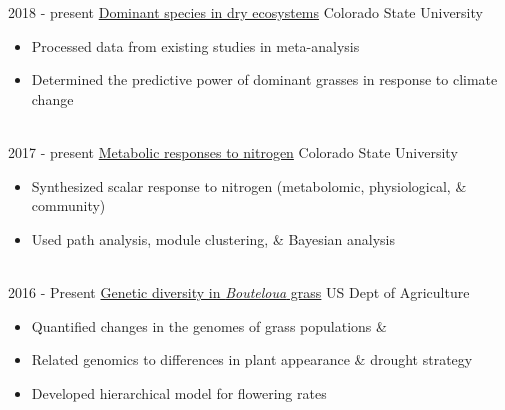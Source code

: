 \documentclass[letterpaper]{twentysecondcv} %
\begin{document}
\begin{twenty} %
    \twentyitem
   		{2018 -}
		{present}
        {\href{https://github.com/avahoffman/dryland-dominance}{Dominant species in dry ecosystems}}
       	{Colorado State University}
        {}
        {
        \vspace{-2mm}
        {\begin{itemize}
        \item Processed data from existing studies in meta-analysis
        \item Determined the predictive power of dominant grasses in response to climate change
    \end{itemize}}
        }
     \\
\twentyitem
   		{2017 -}
		{present}
        {\href{https://github.com/avahoffman/change-metabolomics}{Metabolic responses to nitrogen}}
       	{Colorado State University}
        {}
        {
        \vspace{-2mm}
        {\begin{itemize}
        \item Synthesized scalar response to nitrogen (metabolomic, physiological, \& community) 
        \item Used path analysis, module clustering, \& Bayesian analysis
    \end{itemize}}
        }
     \\
\twentyitem
    	{2016 -}
		{Present}
        {\href{}{Genetic diversity in \textit{Bouteloua} grass}}
        {US Dept of Agriculture}
        {}
       {
         \vspace{-2mm}
        {\begin{itemize}
        \item Quantified changes in the genomes of grass populations \& 
        \item Related genomics to differences in plant appearance \& drought strategy
        \item Developed hierarchical model for flowering rates
        \end{itemize}}
        }
        \\
        

\end{twenty}
\end{document}
